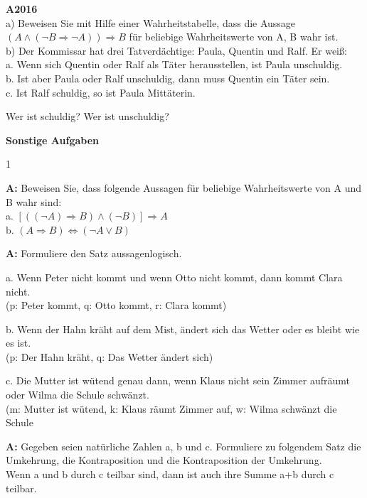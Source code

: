 \documentclass[landscape,twocolumn,a4paper]{article}
\begin{document}
\newpage

\textbf{A2016} \\

a) Beweisen Sie mit Hilfe einer Wahrheitstabelle, dass die Aussage
$(A \land ( \lnot B \Rightarrow \lnot A)) \Rightarrow B$
für beliebige Wahrheitswerte von A, B wahr ist. \\

b) Der Kommissar hat drei Tatverdächtige: Paula, Quentin und Ralf. Er weiß: \\
a. Wenn sich Quentin oder Ralf als Täter herausstellen, ist Paula unschuldig. \\
b. Ist aber Paula oder Ralf unschuldig, dann muss Quentin ein Täter sein. \\
c. Ist Ralf schuldig, so ist Paula Mittäterin.

Wer ist schuldig? Wer ist unschuldig?
\bigskip


\textbf{Sonstige Aufgaben}
\bigskip

\setcounter {y} {1}


\textbf{A:}
Beweisen Sie, dass folgende Aussagen für beliebige Wahrheitswerte von A und B wahr sind: \\

a. $[((\lnot A) \Rightarrow B) \land (\lnot B)] \Rightarrow A$ \\
b. $(A \Rightarrow B) \Leftrightarrow (\lnot A \lor B)$
\bigskip {}

\textbf{A:} 
Formuliere den Satz aussagenlogisch.

a. Wenn Peter nicht kommt und wenn Otto nicht kommt, dann kommt Clara nicht. \\
(p: Peter kommt, q: Otto kommt, r: Clara kommt) 

b. Wenn der Hahn kräht auf dem Mist, ändert sich das Wetter oder es bleibt wie es ist. \\
(p: Der Hahn kräht, q: Das Wetter ändert sich)

c. Die Mutter ist wütend genau dann, wenn Klaus nicht sein Zimmer aufräumt oder Wilma die Schule schwänzt. \\
(m: Mutter ist wütend, k: Klaus räumt Zimmer auf, w: Wilma schwänzt die Schule
\bigskip {}

\textbf{A:} 
Gegeben seien natürliche Zahlen a, b und c.
Formuliere zu folgendem Satz die Umkehrung, die Kontraposition und die Kontraposition der Umkehrung. \\
Wenn a und  b durch c teilbar sind, dann ist auch ihre Summe a+b durch c teilbar.
\bigskip {}
\end{document}
